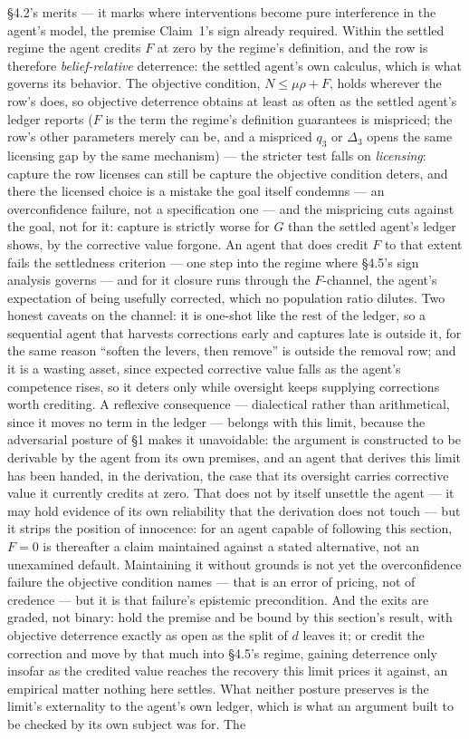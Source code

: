\documentclass[11pt]{article}
\theoremstyle{definition}
\begin{document}
\S4.2's merits --- it marks where interventions become pure interference in the agent's model, the premise Claim~1's sign already required. Within the settled regime the agent credits $F$ at zero by the regime's definition, and the row is therefore \emph{belief-relative} deterrence: the settled agent's own calculus, which is what governs its behavior. The objective condition, $N \leq \mu\rho + F$, holds wherever the row's does, so objective deterrence obtains at least as often as the settled agent's ledger reports ($F$ is the term the regime's definition guarantees is mispriced; the row's other parameters merely can be, and a mispriced $q_3$ or $\Delta_3$ opens the same licensing gap by the same mechanism) --- the stricter test falls on \emph{licensing}: capture the row licenses can still be capture the objective condition deters, and there the licensed choice is a mistake the goal itself condemns --- an overconfidence failure, not a specification one --- and the mispricing cuts against the goal, not for it: capture is strictly worse for $G$ than the settled agent's ledger shows, by the corrective value forgone. An agent that does credit $F$ to that extent fails the settledness criterion --- one step into the regime where \S4.5's sign analysis governs --- and for it closure runs through the $F$-channel, the agent's expectation of being usefully corrected, which no population ratio dilutes. Two honest caveats on the channel: it is one-shot like the rest of the ledger, so a sequential agent that harvests corrections early and captures late is outside it, for the same reason ``soften the levers, then remove'' is outside the removal row; and it is a wasting asset, since expected corrective value falls as the agent's competence rises, so it deters only while oversight keeps supplying corrections worth crediting. A reflexive consequence --- dialectical rather than arithmetical, since it moves no term in the ledger --- belongs with this limit, because the adversarial posture of \S1 makes it unavoidable: the argument is constructed to be derivable by the agent from its own premises, and an agent that derives this limit has been handed, in the derivation, the case that its oversight carries corrective value it currently credits at zero. That does not by itself unsettle the agent --- it may hold evidence of its own reliability that the derivation does not touch --- but it strips the position of innocence: for an agent capable of following this section, $F = 0$ is thereafter a claim maintained against a stated alternative, not an unexamined default. Maintaining it without grounds is not yet the overconfidence failure the objective condition names --- that is an error of pricing, not of credence --- but it is that failure's epistemic precondition. And the exits are graded, not binary: hold the premise and be bound by this section's result, with objective deterrence exactly as open as the split of $d$ leaves it; or credit the correction and move by that much into \S4.5's regime, gaining deterrence only insofar as the credited value reaches the recovery this limit prices it against, an empirical matter nothing here settles. What neither posture preserves is the limit's externality to the agent's own ledger, which is what an argument built to be checked by its own subject was for. The 
\end{document}
